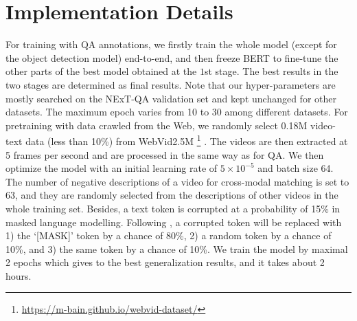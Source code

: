 \documentclass[runningheads]{llncs}
\begin{document}
\setlength{\tabcolsep}{2.3pt}
\begin{table*}[t!]
\small
\centering
\caption{Data statistics. OE: Open-Ended QA. MC: Multi-Choice QA, VLen (s): Average video length in seconds.}
\vspace{-0.8em}
\begin{threeparttable}
    \vspace{-0.5cm}
\label{tab:dataset}
\end{threeparttable}
\end{table*}

\section{Implementation Details}
\label{app:imp}
For training with QA annotations, we firstly train the whole model (except for the object detection model) end-to-end, and then freeze BERT to fine-tune the other parts of the best model obtained at the $1$st stage. The best results in the two stages are determined as final results. Note that our hyper-parameters are mostly searched on the NExT-QA validation set and kept unchanged for other datasets. The maximum epoch varies from 10 to 30 among different datasets. For pretraining with data crawled from the Web, we randomly select 0.18M video-text data (less than 10\%) from WebVid2.5M
\footnote{\url{https://m-bain.github.io/webvid-dataset/}}
\cite{bain2021frozen}. The videos are then extracted at 5 frames per second and are processed in the same way as for QA. We then optimize the model with an initial learning rate of $5\times10^{-5}$ and batch size 64. The number of negative descriptions of a video for cross-modal matching is set to 63, and they are randomly selected from the descriptions of other videos in the whole training set. Besides, a text token is corrupted at a probability of 15\% in masked language modelling. Following \cite{yang2021just}, a corrupted token will be replaced with 1) the `[MASK]' token by a chance of 80\%, 2) a random token by a chance of 10\%, and 3) the same token by a chance of 10\%. We train the model by maximal 2 epochs which gives to the best generalization results, and it takes about 2 hours.
\end{document}
